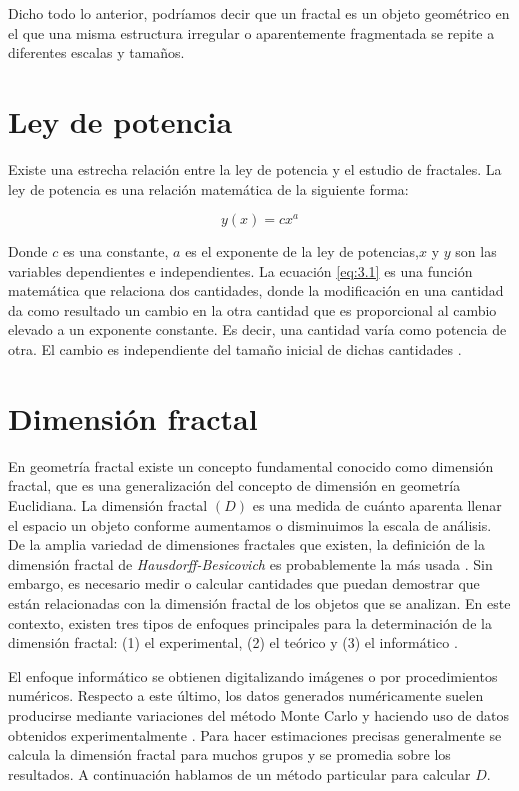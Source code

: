 Dicho todo lo anterior, podr\'{i}amos decir que un fractal es un objeto geom\'{e}trico en el que una misma estructura irregular o aparentemente fragmentada se repite a diferentes escalas y tamaños. 

\section{Ley de potencia} 

Existe una estrecha relaci\'{o}n entre la ley de potencia y el estudio de fractales. La ley de potencia es una relaci\'{o}n matem\'{a}tica de la siguiente forma:

\begin{equation}
	y(x) = cx^{a}
	\label{eq:3.1}
\end{equation}

Donde $c$ es una constante, $a$ es el exponente de la ley de potencias,$x$ y $y$ son las variables dependientes e independientes. La ecuaci\'{o}n \ref{eq:3.1} es una funci\'{o}n matem\'{a}tica que relaciona dos cantidades, donde la modificación en una cantidad da como resultado un cambio en la otra cantidad que es proporcional al cambio elevado a un exponente constante. Es decir, una cantidad var\'{i}a como potencia de otra. El cambio es independiente del tamaño inicial de dichas cantidades \cite{Meakin1998}.


\section{Dimensi\'{o}n fractal}

En geometr\'{i}a fractal existe un concepto fundamental conocido como dimensi\'{o}n fractal, que es una generalizaci\'{o}n del concepto de dimensi\'{o}n en geometr\'{i}a Euclidiana. La dimensi\'{o}n fractal $(D)$ es una medida de cu\'{a}nto aparenta llenar el espacio un objeto conforme aumentamos o disminuimos la escala de an\'{a}lisis. De la  amplia variedad de dimensiones fractales que existen, la definici\'{o}n de la dimensi\'{o}n fractal de \textit{Hausdorff-Besicovich} es probablemente la m\'{a}s usada \cite{Vicsek1992, Meakin1998}. Sin embargo, es necesario medir o calcular cantidades que puedan demostrar que est\'{a}n relacionadas con la dimensi\'{o}n fractal de los objetos que se analizan. En este contexto, existen  tres tipos de enfoques principales para la determinaci\'{o}n de la dimensi\'{o}n fractal: (1) el experimental, (2) el te\'{o}rico y (3) el inform\'{a}tico \cite{Vicsek1992}.

El enfoque inform\'{a}tico se obtienen digitalizando im\'{a}genes o por procedimientos num\'{e}ricos. Respecto a este \'{u}ltimo, los datos generados num\'{e}ricamente suelen producirse mediante variaciones del m\'{e}todo Monte Carlo y haciendo uso de datos obtenidos experimentalmente \cite{Vicsek1992}. Para hacer estimaciones precisas generalmente se calcula la dimensi\'{o}n fractal para muchos grupos y se promedia sobre los resultados. A continuaci\'{o}n hablamos de un m\'{e}todo particular para calcular $D$.

